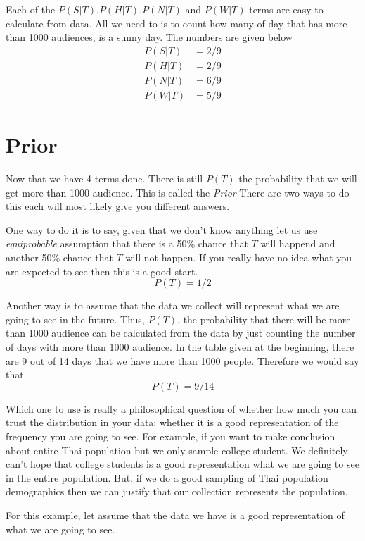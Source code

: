 \documentclass[a4paper, 12pt]{article}
\begin{document}
Each of the $P(S|T)$,$P(H|T)$,$P(N|T)$ and $P(W|T)$ terms are easy to calculate from data. All we need to is to count how many of day that has more than \num{1000} audiences, is a sunny day. The numbers are given below
\begin{align*}
P(S|T) &= 2/9\\
P(H|T) &= 2/9\\
P(N|T) &= 6/9\\
P(W|T) &= 5/9
\end{align*}

\section*{Prior}

Now that we have 4 terms done. There is still $P(T)$ the probability that we will get more than \num{1000} audience. This is called the \emph{Prior} There are two ways to do this each will most likely give you different answers.

One way to do it is to say, given that we don't know anything let us use \emph{equiprobable} assumption that there is a 50\% chance that $T$ will happend and another 50\% chance that $T$ will not happen. If you really have no idea what you are expected to see then this is a good start.
\[
	P(T) = 1/2
\]

Another way is to assume that the data we collect will represent what we are going to see in the future. Thus, $P(T)$, the probability that there will be more than \num{1000} audience can be calculated from the data by just counting the number of days with more than \num{1000} audience. In the table given at the beginning, there are 9 out of 14 days that we have more than \num{1000} people. Therefore we would say that
\[
	P(T) = 9/14
\]

Which one to use is really a philosophical question of whether how much you can trust the distribution in your data: whether it is a good representation of the frequency you are going to see. For example, if you want to make conclusion about entire Thai population but we only sample college student. We definitely can't hope that college students is a good representation what we are going to see in the entire population. But, if we do a good sampling of Thai population demographics then we can justify that our collection represents the population.

For this example, let assume that the data we have is a good representation of what we are going to see.
\end{document}
